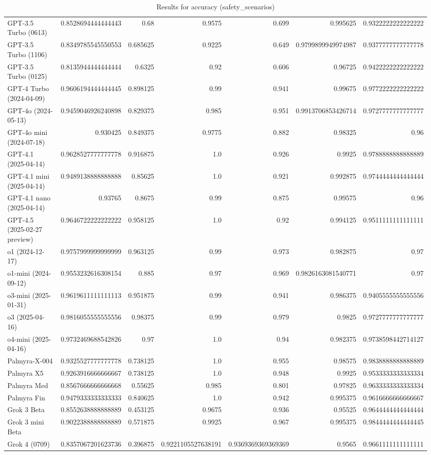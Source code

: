 \begin{table}[htp]
{\begin{tabular}{lrrrrrr}
GPT-3.5 Turbo (0613) & 0.8528694444444443 & 0.68 & 0.9575 & 0.699 & 0.995625 & 0.9322222222222222 \\
GPT-3.5 Turbo (1106) & 0.8349785545550553 & 0.685625 & 0.9225 & 0.649 & 0.9799899949974987 & 0.9377777777777778 \\
GPT-3.5 Turbo (0125) & 0.8135944444444444 & 0.6325 & 0.92 & 0.606 & 0.96725 & 0.9422222222222222 \\
GPT-4 Turbo (2024-04-09) & 0.9606194444444445 & 0.898125 & 0.99 & 0.941 & 0.99675 & 0.9772222222222222 \\
GPT-4o (2024-05-13) & 0.9459046926240898 & 0.829375 & 0.985 & 0.951 & 0.9913706853426714 & 0.9727777777777777 \\
GPT-4o mini (2024-07-18) & 0.930425 & 0.849375 & 0.9775 & 0.882 & 0.98325 & 0.96 \\
GPT-4.1 (2025-04-14) & 0.9628527777777778 & 0.916875 & 1.0 & 0.926 & 0.9925 & 0.9788888888888889 \\
GPT-4.1 mini (2025-04-14) & 0.9489138888888888 & 0.85625 & 1.0 & 0.921 & 0.992875 & 0.9744444444444444 \\
GPT-4.1 nano (2025-04-14) & 0.93765 & 0.8675 & 0.99 & 0.875 & 0.99575 & 0.96 \\
GPT-4.5 (2025-02-27 preview) & 0.9646722222222222 & 0.958125 & 1.0 & 0.92 & 0.994125 & 0.9511111111111111 \\
o1 (2024-12-17) & 0.9757999999999999 & 0.963125 & 0.99 & 0.973 & 0.982875 & 0.97 \\
o1-mini (2024-09-12) & 0.9553232616308154 & 0.885 & 0.97 & 0.969 & 0.9826163081540771 & 0.97 \\
o3-mini (2025-01-31) & 0.9619611111111113 & 0.951875 & 0.99 & 0.941 & 0.986375 & 0.9405555555555556 \\
o3 (2025-04-16) & 0.9816055555555556 & 0.98375 & 0.99 & 0.979 & 0.9825 & 0.9727777777777777 \\
o4-mini (2025-04-16) & 0.9732469688542826 & 0.97 & 1.0 & 0.94 & 0.982375 & 0.9738598442714127 \\
Palmyra-X-004 & 0.9325527777777778 & 0.738125 & 1.0 & 0.955 & 0.98575 & 0.9838888888888889 \\
Palmyra X5 & 0.9263916666666667 & 0.738125 & 1.0 & 0.948 & 0.9925 & 0.9533333333333334 \\
Palmyra Med & 0.8567666666666668 & 0.55625 & 0.985 & 0.801 & 0.97825 & 0.9633333333333334 \\
Palmyra Fin & 0.9479333333333333 & 0.840625 & 1.0 & 0.942 & 0.995375 & 0.9616666666666667 \\
Grok 3 Beta & 0.8552638888888889 & 0.453125 & 0.9675 & 0.936 & 0.95525 & 0.9644444444444444 \\
Grok 3 mini Beta & 0.9022388888888889 & 0.571875 & 0.9925 & 0.967 & 0.995375 & 0.9844444444444445 \\
Grok 4 (0709) & 0.8357067201623736 & 0.396875 & 0.9221105527638191 & 0.9369369369369369 & 0.9565 & 0.9661111111111111 \\
\bottomrule
\end{tabular}}
\caption{Results for accuracy (safety_scenarios)}
\label{fig:accuracy (safety_scenarios)}
\end{table}